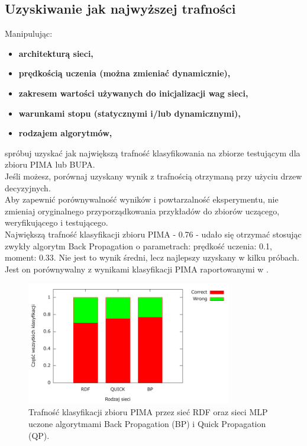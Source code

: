 \subsection{ Uzyskiwanie jak najwyższej trafności}
Manipulując:
\begin{itemize}
\item \textbf{architekturą sieci,}
\item \textbf{prędkością uczenia (można zmieniać dynamicznie),}
\item \textbf{zakresem wartości używanych do inicjalizacji wag sieci,}
\item \textbf{warunkami stopu (statycznymi i/lub dynamicznymi),}
\item \textbf{rodzajem algorytmów,}
\end{itemize}
spróbuj uzyskać jak największą trafność klasyfikowania na zbiorze testującym dla zbioru PIMA lub BUPA.
\\Jeśli możesz, porównaj uzyskany wynik z trafnością otrzymaną przy użyciu drzew decyzyjnych.
\\Aby zapewnić porównywalność wyników i powtarzalność eksperymentu, nie zmieniaj oryginalnego przyporządkowania przykładów do zbiorów uczącego, weryfikującego i testującego.
\\Największą trafność klasyfikacji zbioru PIMA - 0.76  - udało się otrzymać stosując zwykły algorytm Back Propagation o parametrach: prędkość uczenia: 0.1, moment: 0.33. Nie jest to wynik średni, lecz najlepszy uzyskany w kilku próbach. Jest on porównywalny z wynikami klasyfikacji PIMA raportowanymi w \cite{duch10}.
\begin{figure}[h]
\centering
\includegraphics[width=0.8\textwidth]{dane/part1/zad12/compare}
\caption{Trafność klasyfikacji zbioru PIMA przez sieć RDF oraz sieci MLP uczone algorytmami Back Propagation (BP) i Quick Propagation (QP).\label{fig:compare}}
\end{figure}

